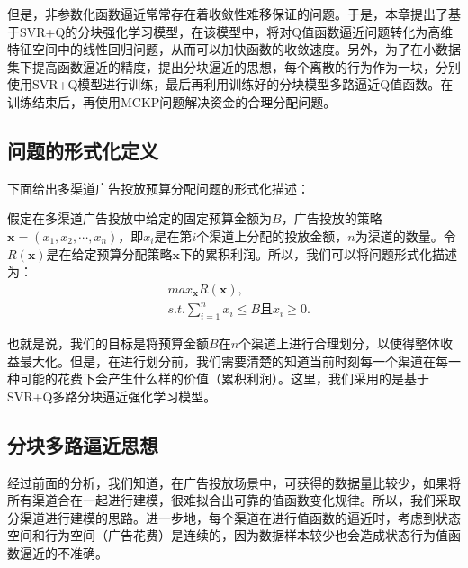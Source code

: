 但是，非参数化函数逼近常常存在着收敛性难移保证的问题。于是，本章提出了基于SVR+Q的分块强化学习模型，在该模型中，将对Q值函数逼近问题转化为高维特征空间中的线性回归问题，从而可以加快函数的收敛速度。另外，为了在小数据集下提高函数逼近的精度，提出分块逼近的思想，每个离散的行为作为一块，分别使用SVR+Q模型进行训练，最后再利用训练好的分块模型多路逼近Q值函数。在训练结束后，再使用MCKP问题解决资金的合理分配问题。

\subsection{问题的形式化定义}
下面给出多渠道广告投放预算分配问题的形式化描述：

假定在多渠道广告投放中给定的固定预算金额为$B$，广告投放的策略$\bm{x}=(x_{1},x_{2},\cdots,x_{n})$，即$x_{i}$是在第$i$个渠道上分配的投放金额，$n$为渠道的数量。令$R(\bm{x})$是在给定预算分配策略$\bm{x}$下的累积利润。所以，我们可以将问题形式化描述为：
\begin{equation}\label{seq_ad_goal}
\begin{split}
&max_{\bm{x}} R(\bm{x}),\\
&s.t. \sum_{i=1}^{n} x_{i} \leqslant B \text{且} x_{i} \geq 0.
\end{split}
\end{equation}

也就是说，我们的目标是将预算金额$B$在$n$个渠道上进行合理划分，以使得整体收益最大化。但是，在进行划分前，我们需要清楚的知道当前时刻每一个渠道在每一种可能的花费下会产生什么样的价值（累积利润）。这里，我们采用的是基于SVR+Q多路分块逼近强化学习模型。

\subsection{分块多路逼近思想}
经过前面的分析，我们知道，在广告投放场景中，可获得的数据量比较少，如果将所有渠道合在一起进行建模，很难拟合出可靠的值函数变化规律。所以，我们采取分渠道进行建模的思路。进一步地，每个渠道在进行值函数的逼近时，考虑到状态空间和行为空间（广告花费）是连续的，因为数据样本较少也会造成状态行为值函数逼近的不准确。

